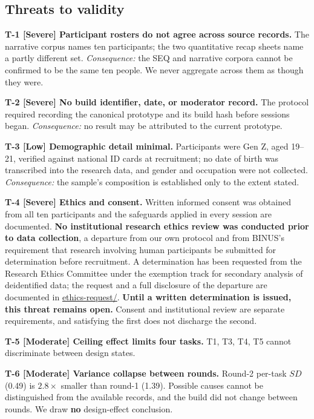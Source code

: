 \documentclass[conference]{IEEEtran}
\begin{document}
\subsection{Threats to validity}

\textbf{T-1 [Severe] Participant rosters do not agree across source records.}
The narrative corpus names ten participants; the two quantitative recap sheets
name a partly different set. \emph{Consequence:} the SEQ and narrative corpora
cannot be confirmed to be the same ten people. We never aggregate across them as
though they were.

\textbf{T-2 [Severe] No build identifier, date, or moderator record.} The
protocol required recording the canonical prototype and its build hash before
sessions began. \emph{Consequence:} no result may be attributed to the current
prototype.

\textbf{T-3 [Low] Demographic detail minimal.} Participants were Gen Z, aged 19--21, verified
against national ID cards at recruitment; no date of birth was transcribed into the research
data, and gender and occupation were not collected. \emph{Consequence:} the sample's composition
is established only to the extent stated.

\textbf{T-4 [Severe] Ethics and consent.} Written informed consent was obtained from all ten
participants and the safeguards applied in every session are documented. \textbf{No institutional
research ethics review was conducted prior to data collection}, a departure from our own protocol and
from BINUS's requirement that research involving human participants be submitted for determination
before recruitment. A determination has been requested from the Research Ethics Committee under the
exemption track for secondary analysis of deidentified data; the request and a full disclosure of the
departure are documented in \url{ethics-request/}. \textbf{Until a written determination is issued,
this threat remains open.} Consent and institutional review are separate requirements, and satisfying
the first does not discharge the second.

\textbf{T-5 [Moderate] Ceiling effect limits four tasks.} T1, T3, T4, T5 cannot
discriminate between design states.

\textbf{T-6 [Moderate] Variance collapse between rounds.} Round-2 per-task $SD$
(0.49) is $2.8\times$ smaller than round-1 (1.39). Possible causes cannot be
distinguished from the available records, and the build did not change between
rounds. We draw \textbf{no} design-effect conclusion.
\end{document}
